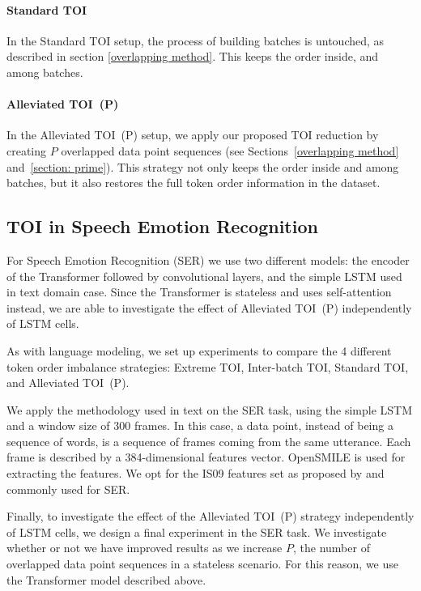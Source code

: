 \documentclass[11pt,a4paper]{article}
\begin{document}
\paragraph{Standard TOI} In the Standard TOI setup, the process of building batches is untouched, as described in section \ref{overlapping method}. This keeps the order inside, and among batches. 

\paragraph{Alleviated TOI~(P)} In the Alleviated TOI~(P) setup, we apply our proposed TOI reduction by creating $P$ overlapped data point sequences (see Sections~\ref{overlapping method} and~\ref{section: prime}). This strategy not only keeps the order inside and among batches, but it also restores the full token order information in the dataset.

\subsection{TOI in Speech Emotion Recognition}

For Speech Emotion Recognition (SER) we use two different models: the encoder of the Transformer \cite{vaswani:2017} followed by convolutional layers, and the simple LSTM used in text domain case. Since the Transformer is stateless and uses self-attention instead, we are able to investigate the effect of Alleviated TOI~(P) independently of LSTM cells.

As with language modeling, we set up experiments to compare the 4 different token order imbalance strategies: Extreme TOI, Inter-batch TOI, Standard TOI, and Alleviated TOI~(P). 

We apply the methodology used in text on the SER task, using the simple LSTM and a window size of 300 frames. In this case, a data point, instead of being a sequence of words, is a sequence of frames coming from the same utterance. Each frame is described by a 384-dimensional features vector. OpenSMILE \cite{Eyben:2013:RDO:2502081.2502224} is used for extracting the features. We opt for the IS09 features set \cite{Schuller2009Interspeech} as proposed by \citet{Ramet2018ContextAwareAM} and commonly used for SER.

Finally, to investigate the effect of the Alleviated TOI~(P) strategy independently of LSTM cells, we design a final experiment in the SER task. We investigate whether or not we have improved results as we increase $P$, the number of overlapped data point sequences in a stateless scenario. For this reason, we use the Transformer model described above.
\end{document}
